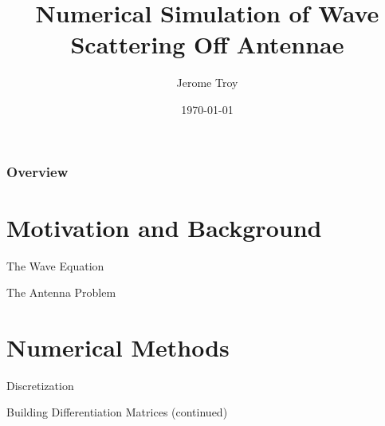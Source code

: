 \documentclass{beamer}
\title[Wave Scattering]{Numerical Simulation of Wave Scattering Off Antennae} %
\author{Jerome Troy} %
\institute[UD] %
{
University of Delaware\\ %
\medskip
}
\date{\today} %
\begin{document}
\begin{frame}
\titlepage %
\end{frame}

\begin{frame}
\frametitle{Overview} %
\tableofcontents %
\end{frame}



\section{Motivation and Background}
\begin{frame}{The Wave Equation}
    
\end{frame}


\begin{frame}{The Antenna Problem}
    
\end{frame}

\section{Numerical Methods}

\begin{frame}{Discretization}
        
\end{frame}

%    

\begin{frame}{Building Differentiation Matrices (continued)}
    
\end{frame}
\end{document}
